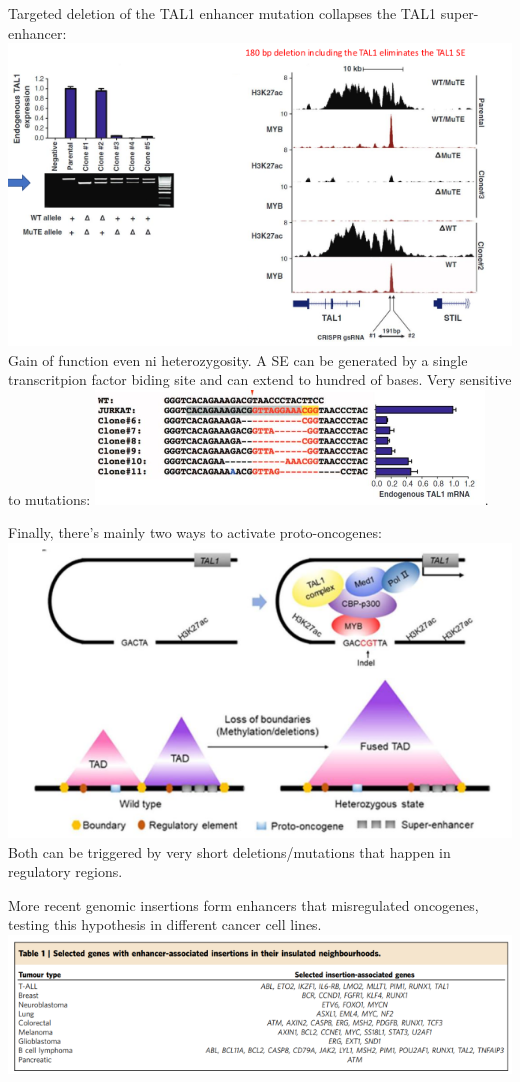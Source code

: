 Targeted deletion of the TAL1 enhancer mutation collapses the TAL1 super-enhancer:
\includegraphics{../_resources/dfb8371fc17e078308c3d5aa247ebcbf.png}
Gain of function even ni heterozygosity. A SE can be generated by a single transcritpion factor biding site and can extend to hundred of bases. Very sensitive to mutations:
\includegraphics{../_resources/fa5ffb6bbc02eb321a2991a3bcfd92c4.png}.

Finally, there's mainly two ways to activate proto-oncogenes:
\includegraphics{../_resources/8bd5f4820c364c35b02c35eb0e48f464.png}
Both can be triggered by very short deletions/mutations that happen in regulatory regions.

More recent genomic insertions form enhancers that misregulated oncogenes, testing this hypothesis in different cancer cell lines.
\includegraphics{../_resources/2d36e2c5659b9cf459872faefbfda869.png}

